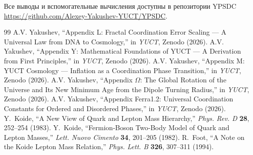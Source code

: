 \documentclass[11pt,a4paper]{article}
\theoremstyle{remark}
\begin{document}
	Все выводы и вспомогательные вычисления доступны в репозитории YPSDC \url{https://github.com/Alexey-Yakushev-YUCT/YPSDC}.
	
	\begin{thebibliography}{99}
		 A.V. Yakushev, ``Appendix L: Fractal Coordination Error Scaling — A Universal Law from DNA to Cosmology,'' in \emph{YUCT}, Zenodo (2026).
		 A.V. Yakushev, ``Appendix Y: Mathematical Foundations of YUCT — A Derivation from First Principles,'' in \emph{YUCT}, Zenodo (2026).
		 A.V. Yakushev, ``Appendix M: YUCT Cosmology — Inflation as a Coordination Phase Transition,'' in \emph{YUCT}, Zenodo (2026).
		 A.V. Yakushev, ``Appendix $\Omega$: The Global Rotation of the Universe and Its New Minimum Age from the Dipole Turning Radius,'' in \emph{YUCT}, Zenodo (2026).
		 A.V. Yakushev, ``Appendix Ferra1.2: Universal Coordination Constants for Ordered and Disordered Phases,'' in \emph{YUCT}, Zenodo (2026).
		 Y.~Koide, ``A New View of Quark and Lepton Mass Hierarchy,''
		\emph{Phys. Rev. D} \textbf{28}, 252--254 (1983).
		 Y.~Koide, ``Fermion‑Boson Two‑Body Model of Quark and Lepton Masses,''
		\emph{Lett. Nuovo Cimento} \textbf{34}, 201--205 (1982).
		 R.~Foot, ``A Note on the Koide Lepton Mass Relation,''
		\emph{Phys. Lett. B} \textbf{326}, 307--311 (1994).
	\end{thebibliography}
	
\end{document}
